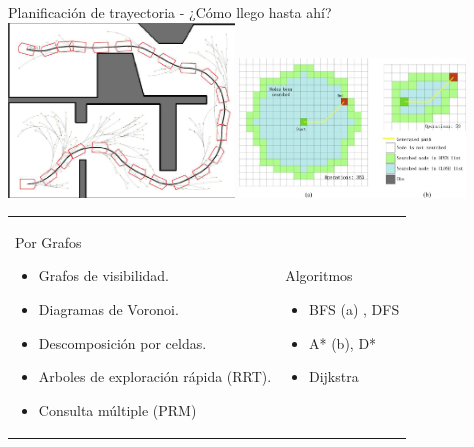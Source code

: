 \documentclass[
  24pt, %
  aspectratio=169, %
]{beamer}
\begin{document}
\begin{frame}{Planificación de trayectoria - ¿Cómo llego hasta ahí?}
  \bigskip %
  \centering
  \includegraphics[width=0.45\textwidth,height=0.30\textheight]{rrt}
  \hfil
  \includegraphics[width=0.45\textwidth,height=0.30\textheight]{astar.jpg}
  \vspace{0.5pt}\\
  \bigskip %
  \addvspace{\medskipamount}
  \noindent
  \begin{tabularx}{\linewidth}{ @{} X X @{} }
    Por Grafos \footnotemark
    
    \begin{itemize}
    \item Grafos de visibilidad. 
    \item Diagramas de Voronoi.
    \item Descomposición por celdas.
    \item Arboles de exploración rápida (RRT).
    \item Consulta múltiple (PRM)
    \end{itemize} &

    Algoritmos
    
    \begin{itemize}
    \item BFS (a) , DFS
    \item A* (b), D*
    \item Dijkstra
    \end{itemize}
  \end{tabularx}
\end{frame}
\end{document}
